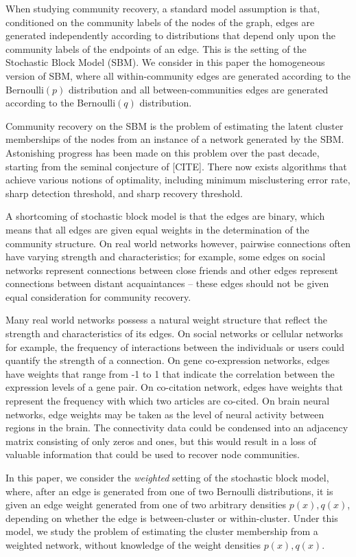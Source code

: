\documentclass{article}
\begin{document}
When studying community recovery, a standard model assumption is that, conditioned on the community labels of the nodes of the graph, edges are generated independently according to distributions that depend only upon the community labels of the endpoints of an edge. This is the setting of the Stochastic Block Model (SBM). We consider in this paper the homogeneous version of SBM, where all within-community edges are generated according to the Bernoulli$(p)$ distribution and all between-communities edges are generated according to the Bernoulli$(q)$ distribution.

 Community recovery on the SBM is the problem of estimating the latent cluster memberships of the nodes from an instance of a network generated by the SBM. Astonishing progress has been made on this problem over the past decade, starting from the seminal conjecture of [CITE]. There now exists algorithms that achieve various notions of optimality, including minimum misclustering error rate, sharp detection threshold, and sharp recovery threshold.

A shortcoming of stochastic block model is that the edges are binary, which means that all edges are given equal weights in the determination of the community structure. On real world networks however, pairwise connections often have varying strength and characteristics; for example, some edges on social networks represent connections between close friends and other edges represent connections between distant acquaintances -- these edges should not be given equal consideration for community recovery. 

Many real world networks possess a natural weight structure that reflect the strength and characteristics of its edges. On social networks or cellular networks for example, the frequency of interactions between the individuals or users could quantify the strength of a connection. On gene co-expression networks, edges have weights that range from -1 to 1 that indicate the correlation between the expression levels of a gene pair. On co-citation network, edges have weights that represent the frequency with which two articles are co-cited. On brain neural networks, edge weights may be taken as the level of neural activity between regions in the brain. The connectivity data could be condensed into an adjacency matrix consisting of only zeros and ones, but this would result in a loss of valuable information that could be used to recover node communities.

In this paper, we consider the \emph{weighted} setting of the stochastic block model, where, after an edge is generated from one of two Bernoulli distributions, it is given an edge weight generated from one of two arbitrary densities $p(x), q(x)$, depending on whether the edge is between-cluster or within-cluster. Under this model, we study the problem of estimating the cluster membership from a weighted network, without knowledge of the weight densities $p(x), q(x)$.
\end{document}
